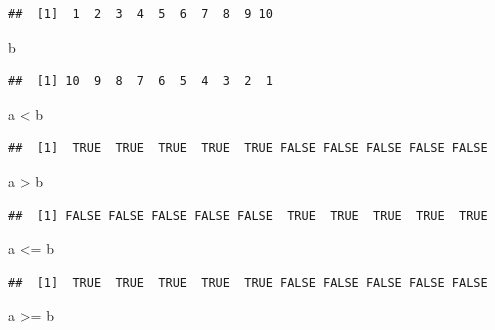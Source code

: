 \documentclass[
  12pt,
]{book}
\newenvironment{Shaded}{\begin{snugshade}}{\end{snugshade}}
\newcommand{\NormalTok}[1]{#1}
\newcommand{\SpecialCharTok}[1]{\textcolor[rgb]{0.00,0.00,0.00}{#1}}
\begin{document}
\begin{verbatim}
##  [1]  1  2  3  4  5  6  7  8  9 10
\end{verbatim}

\begin{Shaded}
\begin{Highlighting}[]
\NormalTok{b}
\end{Highlighting}
\end{Shaded}

\begin{verbatim}
##  [1] 10  9  8  7  6  5  4  3  2  1
\end{verbatim}

\begin{Shaded}
\begin{Highlighting}[]
\NormalTok{a }\SpecialCharTok{\textless{}}\NormalTok{ b}
\end{Highlighting}
\end{Shaded}

\begin{verbatim}
##  [1]  TRUE  TRUE  TRUE  TRUE  TRUE FALSE FALSE FALSE FALSE FALSE
\end{verbatim}

\begin{Shaded}
\begin{Highlighting}[]
\NormalTok{a }\SpecialCharTok{\textgreater{}}\NormalTok{ b}
\end{Highlighting}
\end{Shaded}

\begin{verbatim}
##  [1] FALSE FALSE FALSE FALSE FALSE  TRUE  TRUE  TRUE  TRUE  TRUE
\end{verbatim}

\begin{Shaded}
\begin{Highlighting}[]
\NormalTok{a }\SpecialCharTok{\textless{}=}\NormalTok{ b}
\end{Highlighting}
\end{Shaded}

\begin{verbatim}
##  [1]  TRUE  TRUE  TRUE  TRUE  TRUE FALSE FALSE FALSE FALSE FALSE
\end{verbatim}

\begin{Shaded}
\begin{Highlighting}[]
\NormalTok{a }\SpecialCharTok{\textgreater{}=}\NormalTok{ b}
\end{Highlighting}
\end{Shaded}
\end{document}
